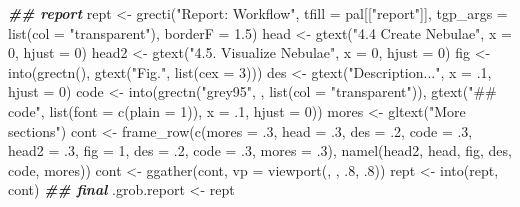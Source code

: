 \documentclass[
]{article}
\newenvironment{Shaded}{\begin{snugshade}}{\end{snugshade}}
\newcommand{\AttributeTok}[1]{\textcolor[rgb]{0.77,0.63,0.00}{#1}}
\newcommand{\DecValTok}[1]{\textcolor[rgb]{0.00,0.00,0.81}{#1}}
\newcommand{\DocumentationTok}[1]{\textcolor[rgb]{0.56,0.35,0.01}{\textbf{\textit{#1}}}}
\newcommand{\FloatTok}[1]{\textcolor[rgb]{0.00,0.00,0.81}{#1}}
\newcommand{\FunctionTok}[1]{\textcolor[rgb]{0.00,0.00,0.00}{#1}}
\newcommand{\NormalTok}[1]{#1}
\newcommand{\OtherTok}[1]{\textcolor[rgb]{0.56,0.35,0.01}{#1}}
\newcommand{\StringTok}[1]{\textcolor[rgb]{0.31,0.60,0.02}{#1}}
\begin{document}
\begin{Shaded}
\begin{Highlighting}[]
\DocumentationTok{\#\# report}
\NormalTok{rept }\OtherTok{\textless{}{-}} \FunctionTok{grecti}\NormalTok{(}\StringTok{"Report: Workflow"}\NormalTok{, }\AttributeTok{tfill =}\NormalTok{ pal[[}\StringTok{"report"}\NormalTok{]],}
               \AttributeTok{tgp\_args =} \FunctionTok{list}\NormalTok{(}\AttributeTok{col =} \StringTok{"transparent"}\NormalTok{), }\AttributeTok{borderF =} \FloatTok{1.5}\NormalTok{)}
\NormalTok{head }\OtherTok{\textless{}{-}} \FunctionTok{gtext}\NormalTok{(}\StringTok{"4.4 Create Nebulae"}\NormalTok{, }\AttributeTok{x =} \DecValTok{0}\NormalTok{, }\AttributeTok{hjust =} \DecValTok{0}\NormalTok{)}
\NormalTok{head2 }\OtherTok{\textless{}{-}} \FunctionTok{gtext}\NormalTok{(}\StringTok{"4.5. Visualize Nebulae"}\NormalTok{, }\AttributeTok{x =} \DecValTok{0}\NormalTok{, }\AttributeTok{hjust =} \DecValTok{0}\NormalTok{)}
\NormalTok{fig }\OtherTok{\textless{}{-}} \FunctionTok{into}\NormalTok{(}\FunctionTok{grectn}\NormalTok{(), }\FunctionTok{gtext}\NormalTok{(}\StringTok{"Fig."}\NormalTok{, }\FunctionTok{list}\NormalTok{(}\AttributeTok{cex =} \DecValTok{3}\NormalTok{)))}
\NormalTok{des }\OtherTok{\textless{}{-}} \FunctionTok{gtext}\NormalTok{(}\StringTok{"Description..."}\NormalTok{, }\AttributeTok{x =}\NormalTok{ .}\DecValTok{1}\NormalTok{, }\AttributeTok{hjust =} \DecValTok{0}\NormalTok{)}
\NormalTok{code }\OtherTok{\textless{}{-}} \FunctionTok{into}\NormalTok{(}\FunctionTok{grectn}\NormalTok{(}\StringTok{"grey95"}\NormalTok{, , }\FunctionTok{list}\NormalTok{(}\AttributeTok{col =} \StringTok{"transparent"}\NormalTok{)),}
             \FunctionTok{gtext}\NormalTok{(}\StringTok{"\#\# code"}\NormalTok{,}
                   \FunctionTok{list}\NormalTok{(}\AttributeTok{font =} \FunctionTok{c}\NormalTok{(}\AttributeTok{plain =} \DecValTok{1}\NormalTok{)), }\AttributeTok{x =}\NormalTok{ .}\DecValTok{1}\NormalTok{, }\AttributeTok{hjust =} \DecValTok{0}\NormalTok{))}
\NormalTok{mores }\OtherTok{\textless{}{-}} \FunctionTok{gltext}\NormalTok{(}\StringTok{"More sections"}\NormalTok{)}
\NormalTok{cont }\OtherTok{\textless{}{-}} \FunctionTok{frame\_row}\NormalTok{(}\FunctionTok{c}\NormalTok{(}\AttributeTok{mores =}\NormalTok{ .}\DecValTok{3}\NormalTok{, }\AttributeTok{head =}\NormalTok{ .}\DecValTok{3}\NormalTok{, }\AttributeTok{des =}\NormalTok{ .}\DecValTok{2}\NormalTok{, }\AttributeTok{code =}\NormalTok{ .}\DecValTok{3}\NormalTok{,}
                    \AttributeTok{head2 =}\NormalTok{ .}\DecValTok{3}\NormalTok{, }\AttributeTok{fig =} \DecValTok{1}\NormalTok{, }\AttributeTok{des =}\NormalTok{ .}\DecValTok{2}\NormalTok{, }\AttributeTok{code =}\NormalTok{ .}\DecValTok{3}\NormalTok{, }\AttributeTok{mores =}\NormalTok{ .}\DecValTok{3}\NormalTok{),}
                  \FunctionTok{namel}\NormalTok{(head2, head, fig, des, code, mores))}
\NormalTok{cont }\OtherTok{\textless{}{-}} \FunctionTok{ggather}\NormalTok{(cont, }\AttributeTok{vp =} \FunctionTok{viewport}\NormalTok{(, , .}\DecValTok{8}\NormalTok{, .}\DecValTok{8}\NormalTok{))}
\NormalTok{rept }\OtherTok{\textless{}{-}} \FunctionTok{into}\NormalTok{(rept, cont)}
\DocumentationTok{\#\# final}
\NormalTok{.grob.report }\OtherTok{\textless{}{-}}\NormalTok{ rept}
\end{Highlighting}
\end{Shaded}
\end{document}
